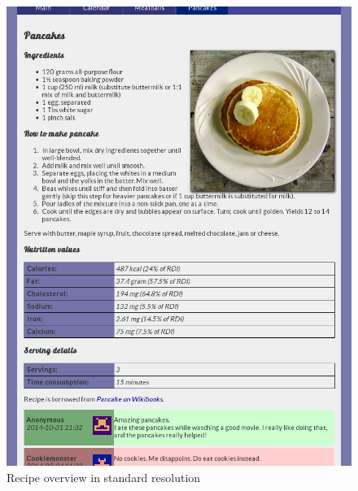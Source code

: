 \documentclass[a4paper]{scrartcl}
\begin{document}
\begin{figure}[!h]
  \begin{center}
    \includegraphics[scale=0.4]{pancakestd1.png}
    \caption{Recipe overview in standard resolution}
    \label{fig:pancakestd}
  \end{center}
\end{figure}
\end{document}
